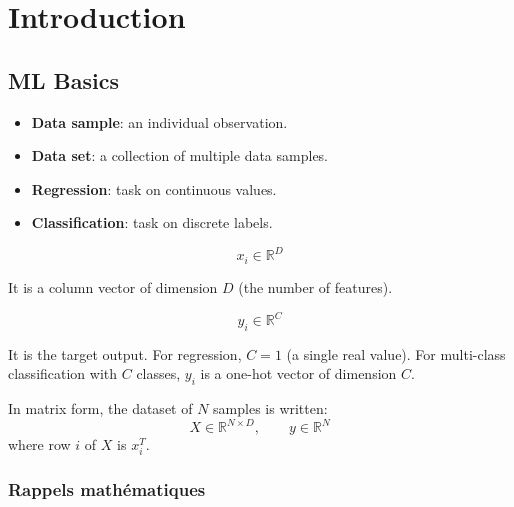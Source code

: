 \documentclass[11pt,a4paper,openany]{book}
\begin{document}
\raggedbottom


\tableofcontents
\clearpage

\chapter{Introduction}

\section{ML Basics}

\begin{defnbox}[title=Definitions]
\begin{itemize}
    \item \textbf{Data sample}: an individual observation.

    \item \textbf{Data set}: a collection of multiple data samples.

    \item \textbf{Regression}: task on continuous values.

    \item \textbf{Classification}: task on discrete labels.
\end{itemize}
\end{defnbox}

\begin{defnbox}[title=Notations]
\[
x_i \in \mathbb{R}^{D}
\]

It is a column vector of dimension $D$ (the number of features).

\vspace{0.4cm}

\[
y_i \in \mathbb{R}^{C}
\]

It is the target output. For regression, $C = 1$ (a single real value). For multi-class classification with $C$ classes, $y_i$ is a one-hot vector of dimension $C$.

\vspace{0.4cm}

In matrix form, the dataset of $N$ samples is written:
\[
X \in \mathbb{R}^{N \times D}, \qquad y \in \mathbb{R}^{N}
\]
where row $i$ of $X$ is $x_i^T$.
\end{defnbox}

\subsection{Rappels mathématiques}
\end{document}
